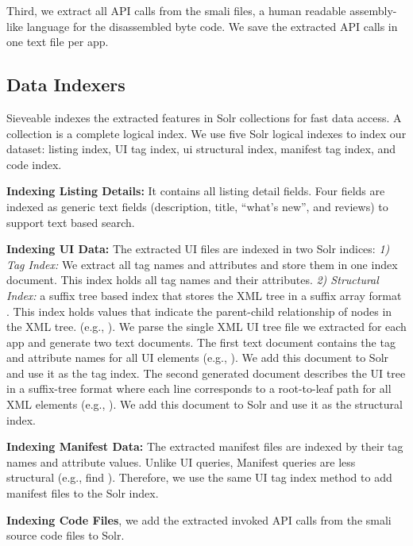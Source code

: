Third, we extract all API calls from the smali files, a human readable assembly-like language for the disassembled byte code.
We save the extracted API calls in one text file per app.

\subsection{Data Indexers}
Sieveable indexes the extracted features in Solr collections for fast data access.
A collection is a complete logical index.
We use five Solr logical indexes to index our dataset: listing index, UI tag index, ui structural index, manifest tag index, and code index.

\textbf{Indexing Listing Details:} It contains all listing detail fields. Four fields are indexed as generic text fields (description, title, ``what's new'', and reviews) to support text based search.

\textbf{Indexing UI Data:} The extracted UI files are indexed in two Solr indices: \textit{1) Tag Index:} We extract all tag names and attributes and store them in one index document.
This index holds all tag names and their attributes.
\textit{2) Structural Index:} a suffix tree based index that stores the XML tree in a suffix array format \cite{shasha_2002_atreegrep}.
This index holds values that indicate the parent-child relationship of nodes in the XML tree. (e.g., ).
We parse the single XML UI tree file we extracted for each app and generate two text documents. The first text document contains the tag and attribute names for all UI elements (e.g., ).
We add this document to Solr and use it as the tag index.
The second generated document describes the UI tree in a suffix-tree format where each line corresponds to a root-to-leaf path for all XML elements (e.g., ).
We add this document to Solr and use it as the structural index.

\textbf{Indexing Manifest Data:} The extracted manifest files are indexed by their tag names and attribute values.
Unlike UI queries, Manifest queries are less structural (e.g., find ).
Therefore, we use the same UI tag index method to add manifest files to the Solr index.

\textbf{Indexing Code Files}, we add the extracted invoked API calls from the smali source code files to Solr.

